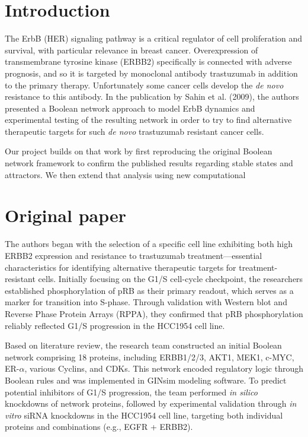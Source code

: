 \documentclass[a4paper,12pt]{article}
\begin{document}
\newpage

\section{Introduction}
The ErbB (HER) signaling pathway is a critical regulator of cell proliferation and survival, with particular relevance in breast cancer. Overexpression of transmembrane tyrosine kinase (ERBB2) specifically is connected with adverse prognosis, and so it is targeted by monoclonal antibody trastuzumab in addition to the primary therapy. Unfortunately some cancer cells develop the \textit{de novo} resistance to this antibody. In the publication by Sahin et al. (2009), the authors presented a Boolean network approach to model ErbB dynamics and experimental testing of the resulting network in order to try to find alternative therapeutic targets for such \textit{de novo} trastuzumab resistant cancer cells.

Our project builds on that work by first reproducing the original Boolean network framework to confirm the published results regarding stable states and attractors. We then extend that analysis using new computational


\section{Original paper}

The authors began with the selection of a specific cell line exhibiting both high ERBB2 expression and resistance to trastuzumab treatment—essential characteristics for identifying alternative therapeutic targets for treatment-resistant cells. Initially focusing on the G1/S cell-cycle checkpoint, the researchers established phosphorylation of pRB as their primary readout, which serves as a marker for transition into S-phase. Through validation with Western blot and Reverse Phase Protein Arrays (RPPA), they confirmed that pRB phosphorylation reliably reflected G1/S progression in the HCC1954 cell line.

Based on literature review, the research team constructed an initial Boolean network comprising 18 proteins, including ERBB1/2/3, AKT1, MEK1, c-MYC, ER-$\alpha$, various Cyclins, and CDKs. This network encoded regulatory logic through Boolean rules and was implemented in GINsim modeling software. To predict potential inhibitors of G1/S progression, the team performed \textit{in silico} knockdowns of network proteins, followed by experimental validation through \textit{in vitro} siRNA knockdowns in the HCC1954 cell line, targeting both individual proteins and combinations (e.g., EGFR + ERBB2).
\end{document}
